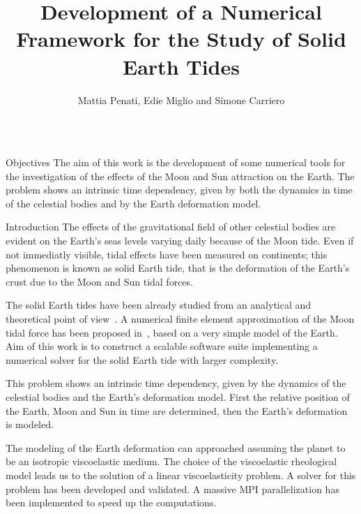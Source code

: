 \documentclass[final]{beamer}
\title{Development of a Numerical Framework for the Study of Solid Earth Tides}
\author{Mattia Penati, Edie Miglio and Simone Carriero}
\institute{Politecnico di Milano - Department of Mathematics - MOX}
\newlength{\onecolwid}
\begin{document}

\setlength{\belowcaptionskip}{2ex}
\setlength\belowdisplayshortskip{2ex}

\begin{frame}[t]

\begin{columns}[t]

\begin{column}{\onecolwid} %

\begin{alertblock}{Objectives}
The aim of this work is the development of some numerical tools for the
investigation of the effects of the Moon and Sun attraction on the Earth. The
problem shows an intrinsic time dependency, given by both the dynamics in time
of the celestial bodies and by the Earth deformation model.
\end{alertblock}

\begin{block}{Introduction}
The effects of the gravitational field of other celestial bodies are evident on
the Earth's seas levels varying daily because of the Moon tide. Even if not
immediatly visible, tidal effects have been measured on continents; this
phenomenon is known as solid Earth tide, that is the deformation of the Earth's
crust due to the Moon and Sun tidal forces.

The solid Earth tides have been already studied from an analytical and
theoretical point of view~\cite{Carcaterra-Doglioni:tidal-ratchet}. A numerical
finite element approximation of the Moon tidal force has been proposed
in~\cite{Xing:fe-tidal}, based on a very simple model of the Earth. Aim of this
work is to construct a scalable software suite implementing a numerical solver
for the solid Earth tide with larger complexity.

This problem shows an intrinsic time dependency, given by the dynamics of the
celestial bodies and the Earth's deformation model. First the relative position
of the Earth, Moon and Sun in time are determined, then the Earth's deformation
is modeled.

The modeling of the Earth deformation can approached assuming the
planet to be an isotropic viscoelastic medium. The choice of the viscoelastic
rheological model leads us to the solution of a linear viscoelasticity problem.
A solver for this problem has been developed and validated. A massive MPI
parallelization has been implemented to speed up the computations. 
\end{block}


\end{column}
\end{columns}
\end{frame}
\end{document}
